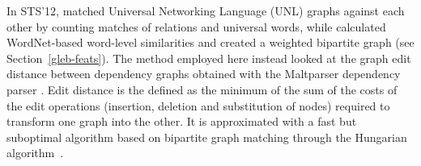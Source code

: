 In STS'12, \citet{singh-bhattacharya-bhattacharyya:2012:STARSEM-SEMEVAL} 
matched Universal Networking Language (UNL) graphs against each other 
by counting matches of relations and universal words, while
\citet{bhagwani-satapathy-karnick:2012:STARSEM-SEMEVAL} calculated
WordNet-based word-level similarities and created a weighted bipartite graph 
(see Section~\ref{gleb-feats}).
%
The method employed here instead looked at the graph edit distance 
between dependency graphs obtained with the
Maltparser dependency parser \citep{Nivre06maltparser:a}.
Edit distance is the defined as the minimum of the sum of the costs of the edit operations (insertion, deletion and substitution of nodes) required to transform one graph into the other.
It is approximated with a fast but suboptimal algorithm based on bipartite graph matching through the Hungarian algorithm~\citep{RiesenBunke:2009}.
